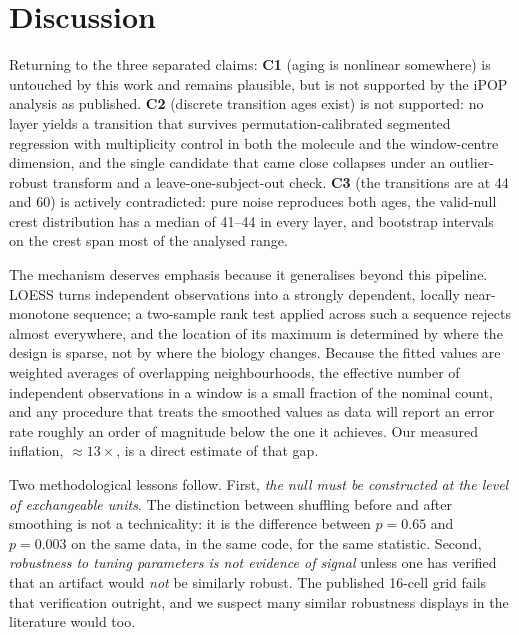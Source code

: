 \documentclass{article}
\begin{document}
\section{Discussion}

Returning to the three separated claims: \textbf{C1} (aging is nonlinear somewhere) is untouched by this work and remains plausible, but is not supported by the iPOP analysis as published. \textbf{C2} (discrete transition ages exist) is not supported: no layer yields a transition that survives permutation-calibrated segmented regression with multiplicity control in both the molecule and the window-centre dimension, and the single candidate that came close collapses under an outlier-robust transform and a leave-one-subject-out check. \textbf{C3} (the transitions are at 44 and 60) is actively contradicted: pure noise reproduces both ages, the valid-null crest distribution has a median of 41--44 in every layer, and bootstrap intervals on the crest span most of the analysed range.

The mechanism deserves emphasis because it generalises beyond this pipeline. LOESS turns independent observations into a strongly dependent, locally near-monotone sequence; a two-sample rank test applied across such a sequence rejects almost everywhere, and the location of its maximum is determined by where the design is sparse, not by where the biology changes. Because the fitted values are weighted averages of overlapping neighbourhoods, the effective number of independent observations in a window is a small fraction of the nominal count, and any procedure that treats the smoothed values as data will report an error rate roughly an order of magnitude below the one it achieves. Our measured inflation, ${\approx}13\times$, is a direct estimate of that gap.

Two methodological lessons follow. First, \emph{the null must be constructed at the level of exchangeable units}. The distinction between shuffling before and after smoothing is not a technicality: it is the difference between $p=0.65$ and $p=0.003$ on the same data, in the same code, for the same statistic. Second, \emph{robustness to tuning parameters is not evidence of signal} unless one has verified that an artifact would \emph{not} be similarly robust. The published 16-cell grid fails that verification outright, and we suspect many similar robustness displays in the literature would too.
\end{document}
